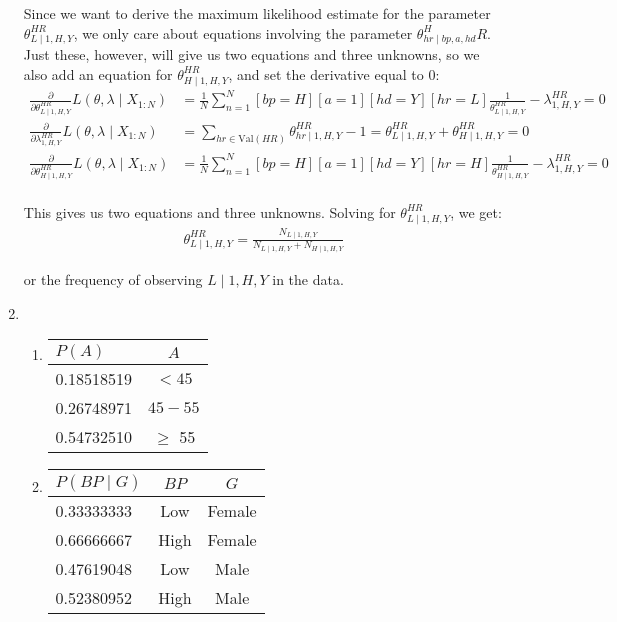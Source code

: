 \documentclass[12pt]{article}
\begin{document}
\begin{enumerate}
Since we want to derive the maximum likelihood estimate for the parameter $\theta_{L\mid1,H,Y}^{HR}$, we only care about equations involving the parameter $\theta_{hr\mid bp,a,hd}^HR$. Just these, however, will give us two equations and three unknowns, so we also add an equation for $\theta_{H\mid1,H,Y}^{HR}$, and set the derivative equal to 0:
\begin{align*}
\frac{\partial}{\partial\theta_{L\mid1,H,Y}^{HR}}L(\theta,\lambda\mid X_{1:N})&=\frac{1}{N}\sum_{n=1}^N[bp=H][a=1][hd=Y][hr=L]\frac{1}{\theta_{L\mid 1,H,Y}^{HR}}-\lambda^{HR}_{1,H,Y} = 0\\
\frac{\partial}{\partial\lambda^{HR}_{1,H,Y}}L(\theta,\lambda\mid X_{1:N})&=\sum_{hr\in\mathrm{Val}(HR)}\theta_{hr\mid 1,H,Y}^{HR}-1 = \theta_{L\mid 1,H,Y}^{HR} + \theta_{H\mid 1,H,Y}^{HR} = 0\\
\frac{\partial}{\partial\theta_{H\mid1,H,Y}^{HR}}L(\theta,\lambda\mid X_{1:N})&=\frac{1}{N}\sum_{n=1}^N[bp=H][a=1][hd=Y][hr=H]\frac{1}{\theta_{H\mid 1,H,Y}^{HR}}-\lambda^{HR}_{1,H,Y} = 0\\
\end{align*}

This gives us two equations and three unknowns. Solving for $\theta_{L\mid1,H,Y}^{HR}$, we get:
\begin{align*}
\theta_{L\mid1,H,Y}^{HR} = \frac{N_{L\mid1,H,Y}}{N_{L\mid1,H,Y}+N_{H\mid1,H,Y}}
\end{align*}

or the frequency of observing $L\mid 1,H,Y$ in the data.

\item %
\begin{enumerate}
\item

\begin{tabular}{lc}
$P(A)$ & $A$ \\ \hline
0.18518519 & $< 45$ \\
0.26748971 & $45-55$ \\
0.54732510 & $\geq$ 55
\end{tabular}

\item

\begin{tabular}{lcc}
$P(BP\mid G)$ & $BP$ & $G$ \\ \hline
0.33333333 & Low & Female \\
0.66666667 & High & Female \\
0.47619048 & Low & Male \\
0.52380952 & High & Male
\end{tabular}


\end{enumerate}
\end{enumerate}
\end{document}
